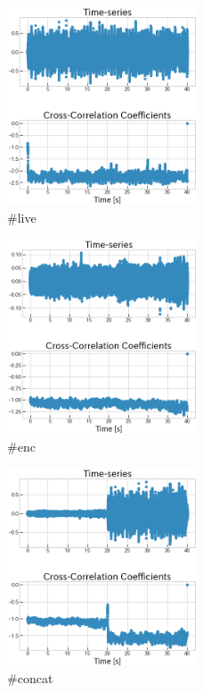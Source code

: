 \documentclass[technicalreport]{ieicej}
\begin{document}
\begin{figure}
	\centering
	\includegraphics[width=0.5\textwidth]{fig/live.png}
	\caption{\#live}
	\label{fig:result_live}
\end{figure}
\begin{figure}
	\centering
	\includegraphics[width=0.5\textwidth]{fig/env.png}
	\caption{\#enc}
	\label{fig:result_env}
\end{figure}
\begin{figure}
	\centering
	\includegraphics[width=0.5\textwidth]{fig/concat.png}
	\caption{\#concat}
	\label{fig:result_concat}
\end{figure}
\end{document}
